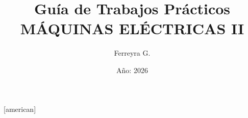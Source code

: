 \usepackage[utf8]{inputenc}
\usepackage[spanish]{babel}
\usepackage{circuitikz}[american]
\usepackage[]{toolsgf,longtable,pgfplots,amsmath,newtxtext,newtxmath}

\newcommand{\materia}{MÁQUINAS  ELÉCTRICAS II}
\newcommand{\TP}{}
\newcommand{\logo}{images/4124}
\newcommand{\email}{gustavoferreyra@outlook.com}
\newcommand{\classroomcode}{ycuvqfn}
\newcommand{\urlqr}{https://es.scribd.com/document/450882398/}

\title{\Huge Guía de Trabajos Prácticos\\\textbf{\materia}}
\author{Ferreyra G.}
\date{Año: 2026}